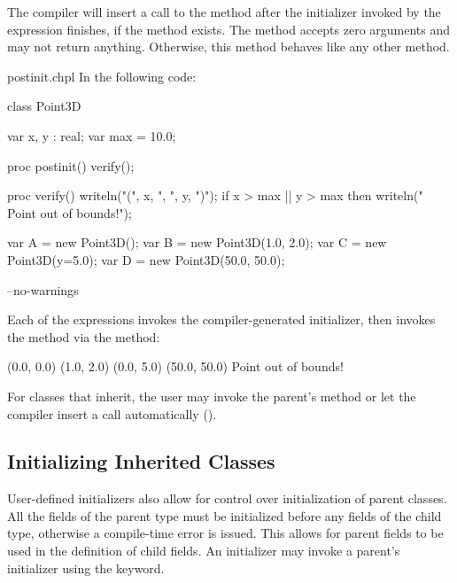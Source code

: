 The compiler will insert a call to the  method after the
initializer invoked by the  expression finishes, if the method
exists. The  method accepts zero arguments and may not return
anything. Otherwise, this method behaves like any other method.

\begin{chapelexample}{postinit.chpl}
In the following code:
\begin{chapel}
class Point3D {
  var x, y : real;
  var max = 10.0;

  proc postinit() {
    verify();
  }

  proc verify() {
    writeln("(", x, ", ", y, ")");
    if x > max || y > max then
      writeln("  Point out of bounds!");
  }
}

var A = new Point3D();
var B = new Point3D(1.0, 2.0);
var C = new Point3D(y=5.0);
var D = new Point3D(50.0, 50.0);
\end{chapel}
\begin{chapelcompopts}
--no-warnings
\end{chapelcompopts}
Each of the  expressions invokes the compiler-generated initializer,
then invokes the  method via the  method:
\begin{chapelprintoutput}{}
(0.0, 0.0)
(1.0, 2.0)
(0.0, 5.0)
(50.0, 50.0)
  Point out of bounds!
\end{chapelprintoutput}
\end{chapelexample}

For classes that inherit, the user may invoke the parent's 
method or let the compiler insert a call automatically
().

\subsection{Initializing Inherited Classes}
\label{Initializing_Inherited}

User-defined initializers also allow for control over initialization of parent
classes. All the fields of the parent type must be initialized before any
fields of the child type, otherwise a compile-time error is issued. This allows
for parent fields to be used in the definition of child fields. An initializer
may invoke a parent's initializer using the  keyword.

